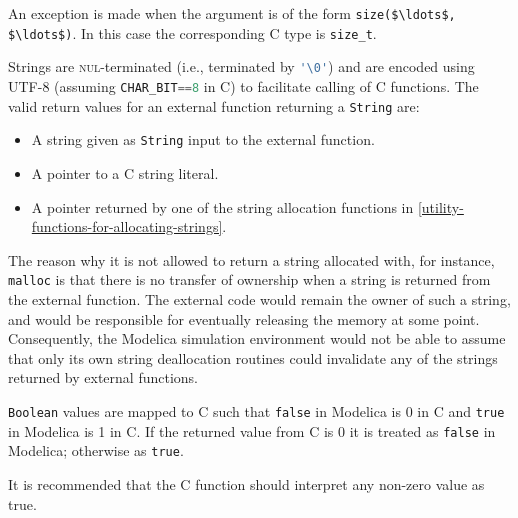 An exception is made when the argument is of the form {\lstinline!size($\ldots$, $\ldots$)!}. In this case the corresponding C type is {\lstinline!size_t!}.

Strings are \textsc{nul}-terminated (i.e., terminated by {\lstinline[language=C]!'\0'!}) and are encoded using UTF-8 (assuming {\lstinline[language=C]!CHAR_BIT==8!} in C) to facilitate calling of C functions.
The valid return values for an external function returning a {\lstinline!String!} are:
\begin{itemize}
\item A string given as {\lstinline!String!} input to the external function.
\item A pointer to a C string literal.
\item A pointer returned by one of the string allocation functions in \cref{utility-functions-for-allocating-strings}.
\end{itemize}

\begin{nonnormative}
The reason why it is not allowed to return a string allocated with, for instance, {\lstinline[language=C]!malloc!} is that there is no transfer of ownership when a string is returned from the external function.
The external code would remain the owner of such a string, and would be responsible for eventually releasing the memory at some point.
Consequently, the Modelica simulation environment would not be able to assume that only its own string deallocation routines could invalidate any of the strings returned by external functions.
\end{nonnormative}

{\lstinline!Boolean!} values are mapped to C such that {\lstinline!false!} in Modelica is 0 in C and {\lstinline!true!} in Modelica is 1 in C.  If the returned value from C is 0 it is treated as {\lstinline!false!} in Modelica; otherwise as {\lstinline!true!}.

\begin{nonnormative}
It is recommended that the C function should interpret any non-zero value as true.
\end{nonnormative}

